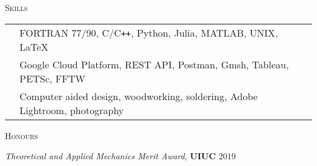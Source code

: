 \documentclass[10pt]{article}
\begin{document}
\begin{multicols}{2}
\textsc{Skills}
\columnbreak

\begin {table}[H]
\begin{tabular}{l l }
\hspace{-0.6em}{Programming} & \hspace{-0.5em} FORTRAN 77/90, C/C\texttt{++}, Python, Julia, MATLAB, UNIX, \LaTeX{}\\
\hspace{-0.6em}{Technologies} & \hspace{-0.5em} Google Cloud Platform, REST API, Postman, Gmsh, Tableau, PETSc, FFTW\\
\hspace{-0.6em}{Design     } & \hspace{-0.5em} Computer aided design, woodworking, soldering, Adobe Lightroom, photography\\
\end{tabular}	
\end{table}

\end{multicols}
\vspace{-1.5em}
\begin{multicols}{2}
\textsc{Honours}
\columnbreak

\textit{Theoretical and Applied Mechanics Merit Award}, \textbf{UIUC} \hfill $2019$


\end{multicols}
\vspace{-1.5em}
\end{document}
